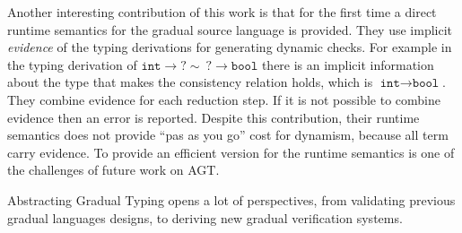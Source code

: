 \documentclass{article}
\newcommand{\quotes}[1]{``#1''}
\begin{document}
Another interesting contribution of this work is that for the first time a direct runtime semantics for the gradual source language is provided. They use implicit \emph{evidence} of the typing derivations for generating dynamic checks. For example in the typing derivation of $\texttt{int} \rightarrow ? \sim \: ? \rightarrow \texttt{bool}$ there is an implicit information about the type that makes the consistency relation holds, which is $\texttt{int} \rightarrow \texttt{bool}$. They combine evidence for each reduction step. If it is not possible to combine evidence then an error is reported. Despite this contribution, their runtime semantics does not provide \quotes{pas as you go} cost for dynamism, because all term carry evidence. To provide an efficient version for the runtime semantics is one of the challenges of future work on AGT. 

Abstracting Gradual Typing opens a lot of perspectives, from validating previous gradual languages designs, to deriving new gradual verification systems.


\medskip 

	
\end{document}
